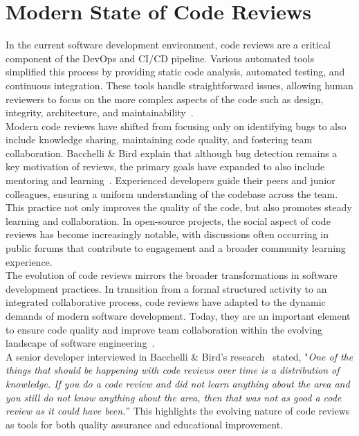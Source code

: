 \section{Modern State of Code Reviews} \label{modern}
In the current software development environment, code reviews are a critical component of the DevOps and CI/CD pipeline. Various automated tools simplified this process by providing static code analysis, automated testing, and continuous integration. These tools handle straightforward issues, allowing human reviewers to focus on the more complex aspects of the code such as design, integrity, architecture, and maintainability~\cite{Tabnine_2023}. \\

Modern code reviews have shifted from focusing only on identifying bugs to also include knowledge sharing, maintaining code quality, and fostering team collaboration. Bacchelli \& Bird explain that although bug detection remains a key motivation of reviews, the primary goals have expanded to also include mentoring and learning~\cite{Bacchelli_Bird_2013}. Experienced developers guide their peers and junior colleagues, ensuring a uniform understanding of the codebase across the team. This practice not only improves the quality of the code, but also promotes steady learning and collaboration. In open-source projects, the social aspect of code reviews has become increasingly notable, with discussions often occurring in public forums that contribute to engagement and a broader community learning experience.\\

The evolution of code reviews mirrors the broader transformations in software development practices. In transition from a formal structured activity to an integrated collaborative process, code reviews have adapted to the dynamic demands of modern software development. Today, they are an important element to ensure code quality and improve team collaboration within the evolving landscape of software engineering~\cite{Wang_evolution}. \\

A senior developer interviewed in Bacchelli \& Bird’s research~\cite{Bacchelli_Bird_2013} stated, "\textit{One of the things that should be happening with code reviews over time is a distribution of knowledge. If you do a code review and did not learn anything about the area and you still do not know anything about the area, then that was not as good a code review as it could have been.}” This highlights the evolving nature of code reviews as tools for both quality assurance and educational improvement.\\


